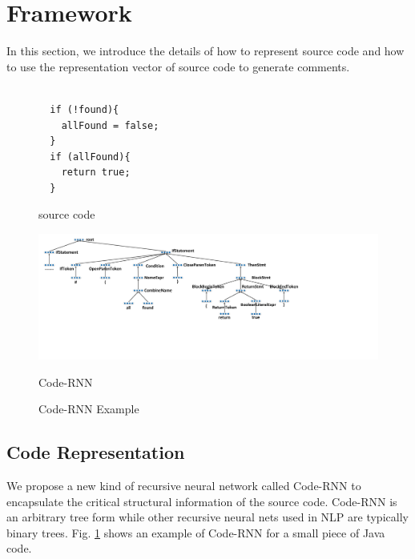 \section{Framework}

In this section, we introduce the details of how to represent source code and how to use the representation vector of source code to generate comments.

\begin{figure}[th]
\begin{minipage}{0.15\linewidth}
  \begin{lstlisting}

  if (!found){
    allFound = false;
  }
  if (allFound){
    return true;
  }
\end{lstlisting}
 \centerline{source code}
\end{minipage}
\hfill
\begin{minipage}{0.9\linewidth}
  \centering
	\includegraphics[width=0.9\linewidth]{img/tree_rnn.pdf}
 \centerline{Code-RNN}
\end{minipage}

\caption{Code-RNN Example}\label{fig:code_rnn}
\end{figure}


\subsection{Code Representation}

We propose a new kind of recursive neural network called Code-RNN to encapsulate
the critical structural information of the source code.
Code-RNN is an arbitrary tree form while other recursive neural nets
used in NLP are typically binary trees. Fig. \ref{fig:code_rnn} shows an
example of Code-RNN for a small piece of Java code.

